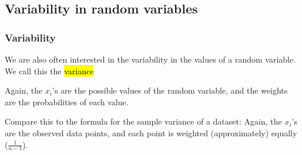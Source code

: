 \documentclass[slidestop,compress,mathserif]{beamer}
\begin{document}

\subsection{Variability in random variables}


\begin{frame}
\frametitle{Variability}

We are also often interested in the variability in the values of a random variable. We call this the \hl{variance}

\formula{
\[ \sigma^2 = Var(X) = \sum_{i = 1}^k (x_i - E(X))^2 P(X = x_i) \]
\[ \sigma = SD(X) = \sqrt{Var(X)} \]
}
Again, the $x_i$'s are the possible values of the random variable, and the weights are the probabilities of each value.

\pause
\begin{small}
Compare this to the formula for the sample variance of a dataset:
\formula{\[ s^2 = \frac{1}{n-1} \sum_{i = 1}^n (x_i - \bar{x})^2 \]}
Again, the $x_i$'s are the observed data points, and each point is weighted (approximately) equally ($\frac{1}{n-1}$).
\end{small}

\end{frame}

\end{document}
